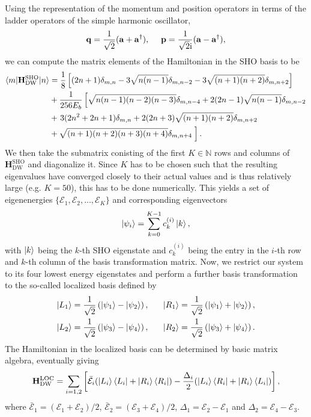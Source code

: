 Using the representation of the momentum and position operators in terms
of the ladder operators of the simple harmonic oscillator,
%
\begin{equation}
    \mathbf{q} = \frac{1}{\sqrt{2}} ( \mathbf{a} + \mathbf{a}^\dagger ), \ \ \ \ \ \\
    \mathbf{p} = \frac{1}{\sqrt{2}\text{i}} ( \mathbf{a} - \mathbf{a}^\dagger ),
\end{equation}
%
we can compute the matrix elements of the Hamiltonian in the SHO basis to be
\begin{align}
    \langle m | \mathbf{H}^{\text{SHO}}_{\text{DW}} | n \rangle
    &= \frac{1}{8} \left[ (2n+1)\delta_{m,n} -3\sqrt{n(n-1)}\delta_{m,n-2}
    - 3\sqrt{(n+1)(n+2)}\delta_{m,n+2} \right] \\
    &+ \frac{1}{256E_b} \left[ \sqrt{n(n-1)(n-2)(n-3)}\delta_{m,n-4}+2(2n-1)\sqrt{n(n-1)}\delta_{m,n-2} \right.\\ 
    &+ \left. 3(2n^2+2n+1)\delta_{m,n} + 2(2n+3)\sqrt{(n+1)(n+2)}\delta_{m,n+2} \right. \\
    &+ \sqrt{(n+1)(n+2)(n+3)(n+4)}\delta_{m,n+4} \left. \vphantom{\sqrt{(1)}}\right].
\end{align}
%
We then take the submatrix conisting of the first $K\in\mathbb{N}$ rows and columns of 
$\mathbf{H}^{\text{SHO}}_{\text{DW}}$ and diagonalize it. Since $K$ has to be chosen such 
that the resulting eigenvalues have converged closely to their actual values and is thus 
relatively large (e.g. $K=50$), this has to be done numerically. This yields a set of 
eigenenergies $\{\mathcal{E}_1,\mathcal{E}_2,...,\mathcal{E}_K\}$ and corresponding 
eigenvectors 
%
\begin{equation}
    \ket{\psi_i} = \sum_{k=0}^{K-1} c_k^{(i)} \ket{k},
\end{equation}
%
with $\ket{k}$ being the $k$-th SHO eigenstate and $c_k^{(i)}$ being the entry in the 
$i$-th row and $k$-th column of the basis transformation matrix. Now, we restrict our system
to its four lowest energy eigenstates and perform a further basis transformation to
the so-called localized basis defined by
%
\begin{align}
    \ket{L_1} &= \frac{1}{\sqrt{2}} \left( \ket{\psi_1} - \ket{\psi_2} \right), \ \ \ \ \ \ket{R_1} = \frac{1}{\sqrt{2}} \left( \ket{\psi_1} + \ket{\psi_2} \right), \\
    \ket{L_2} &= \frac{1}{\sqrt{2}} \left( \ket{\psi_3} - \ket{\psi_4} \right), \ \ \ \ \ \ket{R_2} = \frac{1}{\sqrt{2}} \left( \ket{\psi_3} + \ket{\psi_4} \right).
\end{align}
% 
The Hamiltonian in the localized basis can be determined by basic matrix algebra, eventually 
giving
%
\begin{equation}
    \mathbf{H}^{\text{LOC}}_{\text{DW}} = \sum_{i=1,2} \left[ \bar{\mathcal{E}}_i \\
    (\ket{L_i}\bra{L_i}+\ket{R_i}\bra{R_i}) - \frac{\Delta_i}{2}(\ket{L_i}\bra{R_i}+\ket{R_i}\bra{L_i})\right],
\end{equation}
%
where $\bar{\mathcal{E}}_1 = (\mathcal{E}_1+\mathcal{E}_2)/2$, $\bar{\mathcal{E}}_2 = (\mathcal{E}_3+\mathcal{E}_4)/2$,
$\Delta_1 = \mathcal{E}_2-\mathcal{E}_1$ and $\Delta_2 = \mathcal{E}_4-\mathcal{E}_3$.

